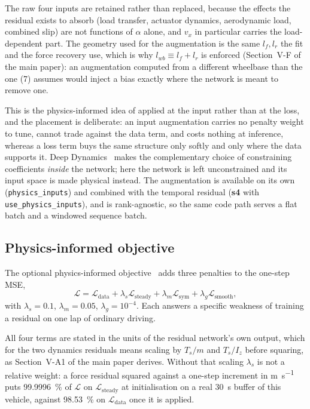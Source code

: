 The raw four inputs are retained rather than replaced, because the effects the
residual exists to absorb (load transfer, actuator dynamics, aerodynamic load,
combined slip) are not functions of $\alpha$ alone, and $v_{x}$ in particular
carries the load-dependent part. The geometry used for the augmentation is the
same $l_{f},l_{r}$ the fit and the force recovery use, which is why
$l_{wb}\equiv l_{f}+l_{r}$ is enforced (Section~V-F of the main paper): an
augmentation computed from a different wheelbase than the one
(7) assumes would inject a bias exactly where the network is
meant to remove one.

This is the physics-informed idea of
\cite{raissi2019pinn,deepdynamics2024} applied at the input rather than at the
loss, and the placement is deliberate: an input augmentation carries no penalty
weight to tune, cannot trade against the data term, and costs nothing at
inference, whereas a loss term buys the same structure only softly and only
where the data supports it. Deep Dynamics~\cite{deepdynamics2024} makes the
complementary choice of constraining coefficients \emph{inside} the network;
here the network is left unconstrained and its input space is made physical
instead. The augmentation is available on its own (\texttt{physics\_inputs})
and combined with the temporal residual (\textbf{s4} with
\texttt{use\_physics\_inputs}), and is rank-agnostic, so the same code path
serves a flat batch and a windowed sequence batch.

\subsection{Physics-informed objective}
\label{sup:pinnloss}
The optional physics-informed
objective~\cite{raissi2019pinn,deepdynamics2024} adds three penalties to the
one-step MSE,
\begin{equation}
\mathcal{L}=\mathcal{L}_{\mathrm{data}}
+\lambda_{s}\mathcal{L}_{\mathrm{steady}}
+\lambda_{m}\mathcal{L}_{\mathrm{sym}}
+\lambda_{g}\mathcal{L}_{\mathrm{smooth}},
\label{eq:pinnloss}
\end{equation}
with $\lambda_{s}=0.1$, $\lambda_{m}=0.05$, $\lambda_{g}=10^{-4}$. Each answers
a specific weakness of training a residual on one lap of ordinary driving.

All four terms are stated in the units of the residual network's own output,
which for the two dynamics residuals means scaling by $T_{s}/m$ and $T_{s}/I_{z}$
before squaring, as Section~V-A1 of the main paper derives. Without that
scaling $\lambda_{s}$ is not a relative weight: a force residual squared
against a one-step increment in \si{\meter\per\second} puts
\SI{99.9996}{\percent} of $\mathcal{L}$ on $\mathcal{L}_{\mathrm{steady}}$ at
initialisation on a real \SI{30}{\second} buffer of this vehicle, against
\SI{98.53}{\percent} on $\mathcal{L}_{\mathrm{data}}$ once it is applied.

